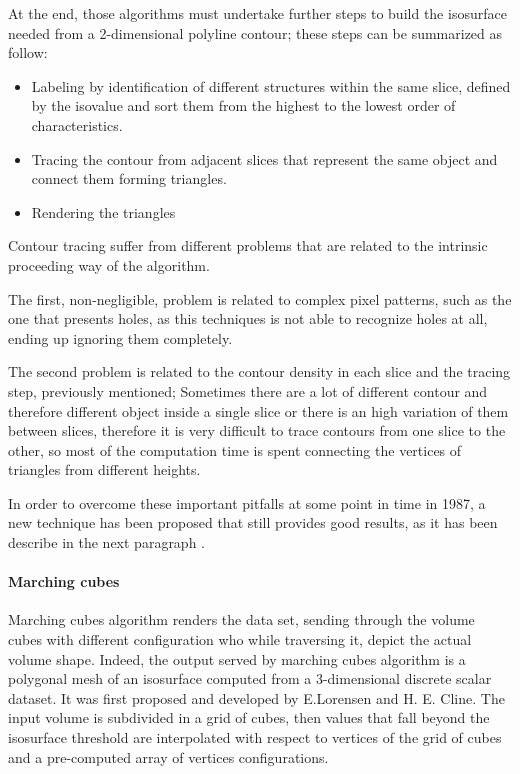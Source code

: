 \documentclass[12pt,a4paper]{extarticle}
\newcommand{\linespace}{\vspace{8pt}}
\begin{document}
At the end, those algorithms must undertake further steps to build the isosurface needed from a 2-dimensional polyline contour; these steps can be summarized as follow:
\begin{itemize}
\item Labeling by identification of different structures within the same slice, defined by the isovalue and sort them from the highest to the lowest order of characteristics.
\item Tracing the contour from adjacent slices that represent the same object and connect them forming triangles.
\item Rendering the triangles
\end{itemize}


Contour tracing suffer from different problems that are related to the intrinsic  proceeding way of the algorithm.

The first, non-negligible, problem is related to complex pixel patterns, such as the one that presents holes, as this techniques is not able to recognize holes at all, ending up ignoring them completely.

The second problem is related to the contour density in each slice and the tracing step, previously mentioned; Sometimes there are a lot of different contour and therefore different object inside a single slice or there is an high variation of them between slices, therefore it is very difficult to trace contours from one slice to the other, so most of the computation time is spent connecting the vertices of triangles from different heights.
\linespace

In order to overcome these important pitfalls at some point in time in 1987, a new technique has been proposed that still provides good results, as it has been describe in the next paragraph \cite{Lorensen:1987:MCH:37402.37422}.
  

\paragraph{Marching cubes}
Marching cubes algorithm renders the data set, sending through the volume cubes with different configuration who while traversing it, depict the actual volume shape. Indeed, the output served by marching cubes algorithm is a polygonal mesh of an isosurface computed from a 3-dimensional discrete scalar dataset. It was first proposed and developed by E.Lorensen and H. E. Cline. The input volume is subdivided in a grid of cubes, then values that fall beyond the isosurface threshold are interpolated with respect to vertices of the grid of cubes and a pre-computed array of vertices configurations.
\end{document}
